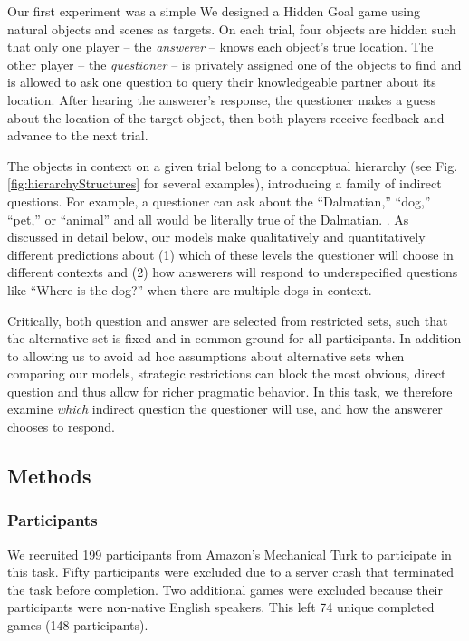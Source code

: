\documentclass[12pt, floatsintext, jou]{apa6}
\begin{document}


Our first experiment was a simple We designed a Hidden Goal game using natural objects and scenes as targets. 
On each trial, four objects are hidden such that only one player -- the \emph{answerer} -- knows each object's true location. 
The other player -- the \emph{questioner} -- is privately assigned one of the objects to find and is allowed to ask one question to query their knowledgeable partner about its location. After hearing the answerer's response, the questioner makes a guess about the location of the target object, then both players receive feedback and advance to the next trial. 

The objects in context on a given trial belong to a conceptual hierarchy (see Fig. \ref{fig:hierarchyStructures} for several examples), introducing a family of indirect questions. 
For example, a questioner can ask about the ``Dalmatian,'' ``dog,'' ``pet,'' or ``animal'' and all would be literally true of the Dalmatian. \cite{Brown58_HowShallAThingBeCalled,GrafEtAl16_BasicLevel}. 
As discussed in detail below, our models make qualitatively and quantitatively different predictions about (1) which of these levels the questioner will choose in different contexts and (2) how answerers will respond to underspecified questions like ``Where is the dog?'' when there are multiple dogs in context.

Critically, both question and answer are selected from restricted sets, such that the alternative set is fixed and in common ground for all participants. 
In addition to allowing us to avoid ad hoc assumptions about alternative sets when comparing our models, strategic restrictions can block the most obvious, direct question and thus allow for richer pragmatic behavior. 
In this task, we therefore examine \emph{which} indirect question the questioner will use, and how the answerer chooses to respond. 

\subsection{Methods}
\subsubsection{Participants} We recruited 199 participants from Amazon's Mechanical Turk to participate in this task. Fifty participants were excluded due to a server crash that terminated the task before completion. Two additional games were excluded because their participants were non-native English speakers. This left 74 unique completed games (148 participants).
\end{document}
